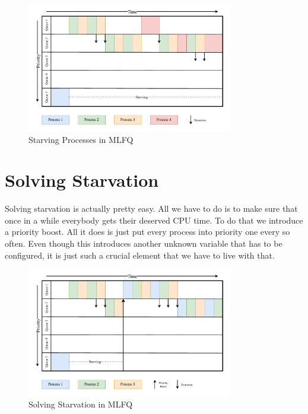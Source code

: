 \begin{figure}[h]
    \centering
    \includegraphics[width=0.8\textwidth]{Assets/MLFQ-Example-3.pdf}
    \caption{Starving Processes in MLFQ}
    \label{fig:mlfq-example-3}
\end{figure}

\newpage

\section{Solving Starvation}

Solving starvation is actually pretty easy.
All we have to do is to make sure that once in a while everybody gets their deserved CPU time.
To do that we introduce a priority boost. All it does is just put every process into priority one every so often.
Even though this introduces another unknown variable that has to be configured, it is just such a crucial element that we have to live with that.

\begin{figure}[h]
    \centering
    \includegraphics[width=0.8\textwidth]{Assets/MLFQ-Example-4.pdf}
    \caption{Solving Starvation in MLFQ}
    \label{fig:mlfq-example-4}
\end{figure}


